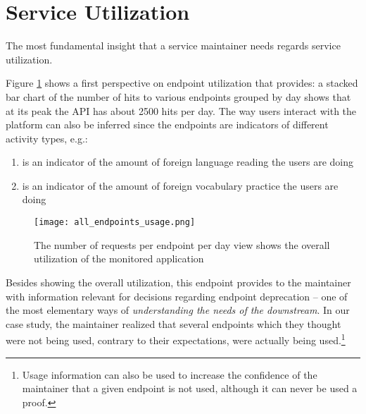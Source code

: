 
\section{Service Utilization}
\label{sec:util}

  The most fundamental insight that a service maintainer needs regards service utilization. \vspace{0.5cm}

  Figure \ref{fig:aeu} shows a first perspective on endpoint utilization that \tool provides: a stacked bar chart of the number of hits to various endpoints grouped by day  shows that at its peak the API has about 2500 hits per day. 
  The way users interact with the platform can also be inferred since the endpoints are indicators of different activity types, e.g.: 

  \begin{enumerate}

    \item {\color{myblue}\epTranslations} is an indicator of the amount of foreign language reading the users are doing

    \item {\color{myviolet} \epOutcome} is an indicator of the amount of foreign vocabulary practice the users are doing

  \end{enumerate}


  \begin{figure}[!ht]
    \centering
    \texttt{[image: all\_endpoints\_usage.png]}
    \caption{The number of requests per endpoint per day view shows the overall utilization of the monitored application}
    \label{fig:aeu}
  \end{figure}

  Besides showing the overall utilization, this endpoint provides to the maintainer with information relevant for decisions regarding endpoint deprecation -- one of the most elementary ways of {\em understanding the needs of the downstream}\cite{Haen14a}. In our case study, the maintainer realized that several endpoints which they thought were not being used, contrary to their expectations, were actually being used.\footnote{Usage information can also be used to increase the confidence of the maintainer that a given endpoint is not used, although it can never be used a proof.}

  \niceseparator



